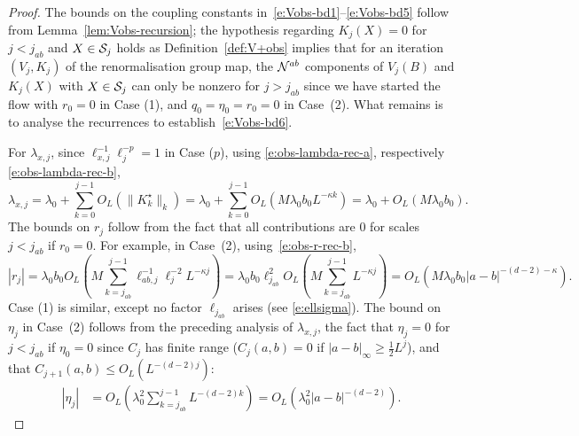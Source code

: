 \documentclass[11pt]{amsart}
\numberwithin{equation}{section}
\numberwithin{theorem}{section}
\newcommand{\1}{{\bf 1}}
\newcommand{\obs}{\star}
\newcommand{\Kobs}{K^\obs}
\newcommand{\ellxj}{\ell_{x,j}}
\newcommand{\OL}{O_L}
\begin{document}
\begin{proof}
  The bounds on the coupling constants in~\eqref{e:Vobs-bd1}--\eqref{e:Vobs-bd5} follow from
  Lemma~\ref{lem:Vobs-recursion};
  the hypothesis regarding
  $K_{j}(X)=0$ for $j<j_{ab}$ and $X\in \mathcal S_{j}$ holds as
  Definition~\ref{def:V+obs} implies that for an iteration
  $(V_j,K_j)$ of the renormalisation group map, the $\mathcal N^{ab}$
  components of $V_j(B)$ and $K_j(X)$ with $X\in \mathcal S_j$ can only
  be nonzero for $j>j_{ab}$ since we have started the flow with
  $r_{0}=0$ in Case (1), and $q_{0}=\eta_{0}=r_{0}=0$ in Case~(2).
  What remains is to analyse the recurrences to establish~\eqref{e:Vobs-bd6}.
  
  For $\lambda_{x,j}$,  since $\ellxj^{-1}\ell_j^{-p} = 1$ in Case ($p$), using
  \eqref{e:obs-lambda-rec-a}, respectively \eqref{e:obs-lambda-rec-b},
  \begin{equation}
    \lambda_{x,j}  = \lambda_0 + \sum_{k=0}^{j-1} \OL(\|\Kobs_k\|_k)
    = \lambda_0 + \sum_{k=0}^{j-1} \OL(M\lambda_0b_0L^{-\kappa k})
    =\lambda_{0} + \OL(M\lambda_{0}b_{0}).
  \end{equation}
  The bounds on $r_{j}$ follow from the fact that all contributions
  are $0$ for scales $j<j_{ab}$ if $r_{0}=0$. For example, in Case~(2),
  using~\eqref{e:obs-r-rec-b},
  \begin{equation}
    |r_j|=
    \lambda_0b_0\OL(M\sum_{k=j_{ab}}^{j-1} \ell_{ab,j}^{-1} \ell_j^{-2}L^{-\kappa j})
    =
    \lambda_0b_0\ell_{j_{ab}}^2 \OL(M\sum_{k=j_{ab}}^{j-1} L^{-\kappa j})
    =\OL(M\lambda_0b_0|a-b|^{-(d-2)-\kappa}).
  \end{equation}
  Case (1) is similar, except no factor $\ell_{j_{ab}}$ arises (see \eqref{e:ellsigma}).
  The bound on $\eta_j$ in Case~(2) 
  follows from the preceding analysis of $\lambda_{x,j}$,
  the fact
  that $\eta_{j}=0$ for $j<j_{ab}$ if $\eta_{0}=0$ since $C_{j}$
  has finite range ($C_{j}(a,b)=0$ if $|a-b|_\infty \geq \frac12 L^{j}$), and that
  $C_{j+1}(a,b) \leq \OL(L^{-(d-2)j})$:
  \begin{align}
    |\eta_j|
    &=\OL(\lambda_0^2 \sum_{k=j_{ab}}^{j-1} L^{-(d-2)k})
      =\OL(\lambda_0^2 |a-b|^{-(d-2)}).
  \end{align}


\end{proof}
\end{document}
